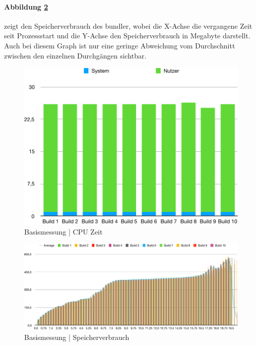 \documentclass[11pt]{report}
\begin{document}
			\paragraph{Abbildung \ref{figure:baseline_memory}} zeigt den Speicherverbrauch des \Gls{bundler}, wobei die X-Achse die vergangene Zeit seit Prozessstart und die Y-Achse den Speicherverbrauch in Megabyte darstellt. Auch bei diesem Graph ist nur eine geringe Abweichung vom Durchschnitt zwischen den einzelnen Durchgängen sichtbar.
			\begin{figure}
                \includegraphics[width=\textwidth]{img/baseline_duration.pdf}
                \caption{Basismessung | CPU Zeit}
                \label{figure:baseline_duration}
            \end{figure}
            \begin{figure}
                \includegraphics[width=\textwidth]{img/baseline_memory.pdf}
                \caption{Basismessung | Speicherverbrauch}
                \label{figure:baseline_memory}
            \end{figure}
\end{document}
